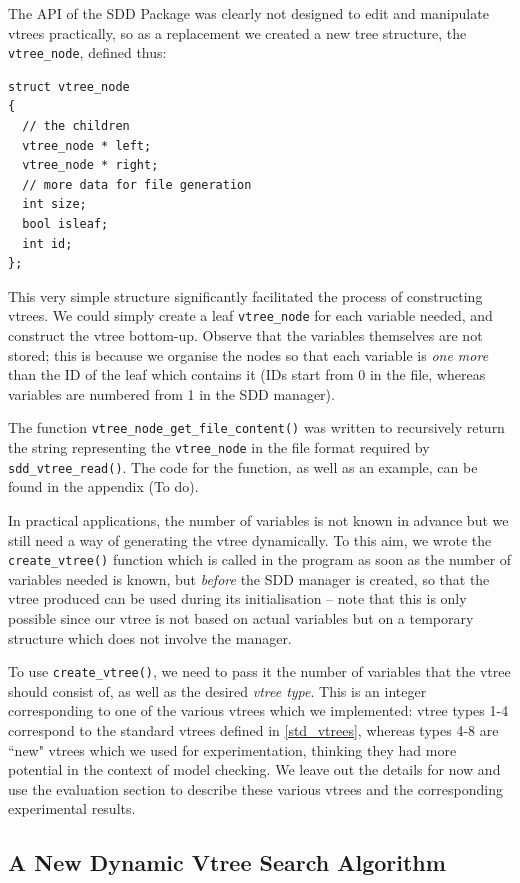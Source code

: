 \documentclass[11pt]{report}
\begin{document}
The API of the SDD Package was clearly not designed to edit and manipulate vtrees practically, so as a replacement we created a new tree structure, the \texttt{vtree\_node}, defined thus: 
\begin{verbatim}
struct vtree_node 
{
  // the children
  vtree_node * left; 
  vtree_node * right;
  // more data for file generation
  int size;
  bool isleaf;
  int id;
};
\end{verbatim}

This very simple structure significantly facilitated the process of constructing vtrees. We could simply create a leaf \texttt{vtree\_node} for each variable needed, and construct the vtree bottom-up. Observe that the variables themselves are not stored; this is because we organise the nodes so that each variable is \textit{one more} than the ID of the leaf which contains it (IDs start from 0 in the file, whereas variables are numbered from 1 in the SDD manager).

 The function \texttt{vtree\_node\_get\_file\_content()} was written to recursively return the string representing the \texttt{vtree\_node} in the file format required by \texttt{sdd\_vtree\_read()}. The code for the function, as well as an example, can be found in the appendix (To do). 

In practical applications, the number of variables is not known in advance but we still need a way of generating the vtree dynamically. To this aim, we wrote the \texttt{create\_vtree()} function which is called in the program as soon as the number of variables needed is known, but \textit{before} the SDD manager is created, so that the vtree produced can be used during its initialisation -- note that this is only possible since our vtree is not based on actual variables but on a temporary structure which does not involve the manager. 

To use \texttt{create\_vtree()}, we need to pass it the number of variables that the vtree should consist of, as well as the desired \textit{vtree type}. This is an integer corresponding to one of the various vtrees which we implemented: vtree types 1-4 correspond to the standard vtrees defined in \ref{std_vtrees}, whereas types 4-8 are ``new" vtrees which we used for experimentation, thinking they had more potential in the context of model checking. We leave out the details for now and use the evaluation section to describe these various vtrees and the corresponding experimental results.

\subsection{A New Dynamic Vtree Search Algorithm}
\label{dynamic_with_sdds_implementation}
\end{document}
